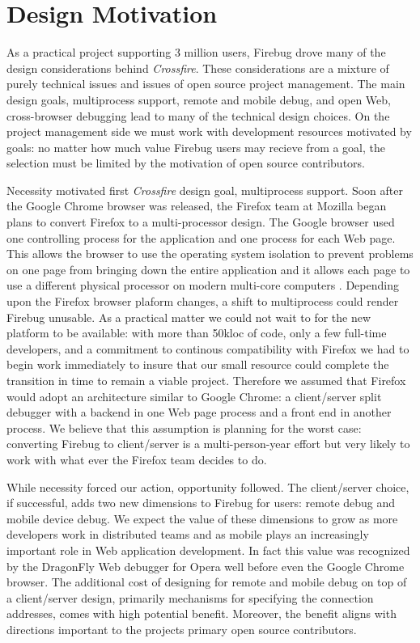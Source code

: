 \section{Design Motivation}
As a practical project supporting 3 million users,  Firebug drove many of the
design considerations behind \textit{Crossfire}. These considerations are a
mixture of purely technical issues and issues of open source project management.
The main design goals, multiprocess support, remote and mobile debug, and open
Web, cross-browser debugging lead to many of the technical design choices. On
the project management side we must work with development resources motivated by
goals: no matter how much value Firebug users may recieve from a goal, the
selection must be limited by the motivation of open source contributors.

Necessity motivated first \textit{Crossfire} design goal, multiprocess support.
Soon after the Google Chrome browser was released, the Firefox team at Mozilla
began plans to convert Firefox to a multi-processor design.  The Google browser
used one controlling process for the application and one process for each Web
page.  This allows the browser to use the operating system isolation to prevent
problems on one page from bringing down the entire application and it allows
each page to use a different physical processor on modern multi-core computers
\cite{GoogleChrome}.  Depending upon the Firefox browser plaform changes, a
shift to multiprocess could render Firebug unusable. As a practical matter we
could not wait to for the new platform to be available: with more than 50kloc of
code, only a few full-time developers, and a commitment to continous
compatibility with Firefox we had to begin work immediately to insure that our
small resource could complete the transition in time to remain a viable project.
Therefore we assumed that Firefox would adopt an architecture similar to Google
Chrome: a client/server split debugger with a backend in one Web page process
and a front end in another process.  We believe that this assumption is planning
for the worst case: converting Firebug to client/server is a multi-person-year
effort but very likely to work with what ever the Firefox team decides to do.

While necessity forced our action, opportunity followed. The client/server
choice, if successful, adds two new dimensions to Firebug for users: remote
debug and mobile device debug. We expect the value of these dimensions to grow
as more developers work in distributed teams and as mobile plays an increasingly
important role in Web application development.  In fact this value was
recognized by the DragonFly Web debugger for Opera well before even the Google
Chrome browser.   The additional cost of designing for remote and mobile debug
on top of a client/server design, primarily mechanisms for specifying the
connection addresses, comes with high potential benefit.  Moreover, the benefit
aligns with directions important to the projects primary open source
contributors.

